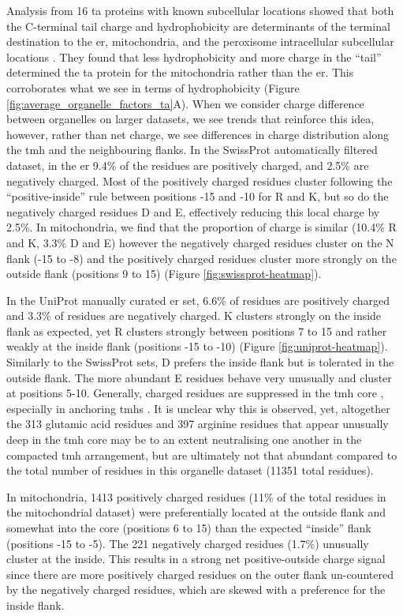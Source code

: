 Analysis from 16 \gls{ta} proteins with known subcellular locations showed that both the C\--terminal tail charge and hydrophobicity are determinants of the terminal destination to the \gls{er}, mitochondria, and the peroxisome intracellular subcellular locations \cite{Costello2017}.
They found that less hydrophobicity and more charge in the ``tail'' determined the \gls{ta} protein for the mitochondria rather than the \gls{er}.
This corroborates what we see in terms of hydrophobicity (Figure \ref{fig:average_organelle_factors_ta}A).
When we consider charge difference between organelles on larger datasets, we see trends that reinforce this idea, however, rather than net charge, we see differences in charge distribution along the \gls{tmh} and the neighbouring flanks.
In the SwissProt automatically filtered dataset, in the \gls{er} 9.4\% of the residues are positively charged, and 2.5\% are negatively charged.
Most of the positively charged residues cluster following the ``positive\--inside'' rule between positions -15 and -10 for R and K, but so do the negatively charged residues D and E, effectively reducing this local charge by 2.5\%.
In mitochondria, we find that the proportion of charge is similar (10.4\% R and K, 3.3\% D and E) however the negatively charged residues cluster on the N flank (-15 to -8) and the positively charged residues cluster more strongly on the outside flank (positions 9 to 15) (Figure \ref{fig:swissprot-heatmap}).

In the UniProt manually curated \gls{er} set, 6.6\% of residues are positively charged and 3.3\% of residues are negatively charged.
K clusters strongly on the inside flank as expected, yet R clusters strongly between positions 7 to 15 and rather weakly at the inside flank (positions -15 to -10) (Figure \ref{fig:uniprot-heatmap}).
Similarly to the SwissProt sets, D prefers the inside flank but is tolerated in the outside flank.
The more abundant E residues behave very unusually and cluster at positions 5-10.
Generally, charged residues are suppressed in the \gls{tmh} core \cite{Sharpe2010, Baeza-Delgado2013}, especially in anchoring \gls{tmh}s \cite{Baker2017}.
It is unclear why this is observed, yet, altogether the 313 glutamic acid residues and 397 arginine residues that appear unusually deep in the \gls{tmh} core may be to an extent neutralising one another in the compacted \gls{tmh} arrangement, but are ultimately not that abundant compared to the total number of residues in this organelle dataset (11351 total residues).

In mitochondria, 1413 positively charged residues (11\% of the total residues in the mitochondrial dataset) were preferentially located at the outside flank and somewhat into the core (positions 6 to 15) than the expected ``inside'' flank (positions -15 to -5).
The 221 negatively charged residues (1.7\%) unusually cluster at the inside.
This results in a strong net positive\--outside charge signal since there are more positively charged residues on the outer flank un\--countered by the negatively charged residues, which are skewed with a preference for the inside flank.


